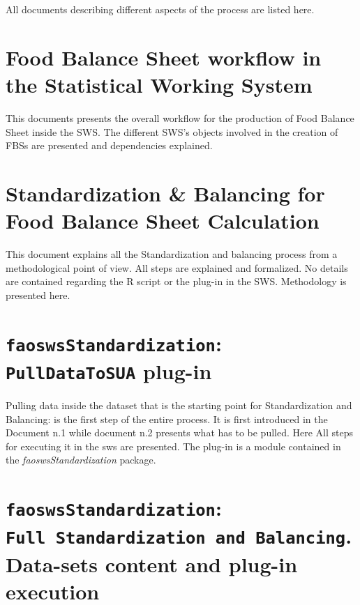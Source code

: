 \documentclass[]{article}
\begin{document}
All documents describing different aspects of the process are listed
here.

\section{Food Balance Sheet workflow in the Statistical Working
System}\label{food-balance-sheet-workflow-in-the-statistical-working-system}

This documents presents the overall workflow for the production of Food
Balance Sheet inside the SWS. The different SWS's objects involved in
the creation of FBSs are presented and dependencies explained.

\section{Standardization \& Balancing for Food Balance Sheet
Calculation}\label{standardization-balancing-for-food-balance-sheet-calculation}

This document explains all the Standardization and balancing process
from a methodological point of view. All steps are explained and
formalized. No details are contained regarding the R script or the
plug-in in the SWS. Methodology is presented here.

\section{\texorpdfstring{\texttt{faoswsStandardization}:
\texttt{PullDataToSUA}
plug-in}{faoswsStandardization: PullDataToSUA plug-in}}\label{faoswsstandardization-pulldatatosua-plug-in}

Pulling data inside the dataset that is the starting point for
Standardization and Balancing: is the first step of the entire process.
It is first introduced in the Document n.1 while document n.2 presents
what has to be pulled. Here All steps for executing it in the sws are
presented. The plug-in is a module contained in the
\emph{faoswsStandardization} package.

\section{\texorpdfstring{\texttt{faoswsStandardization}:
\texttt{Full\ Standardization\ and\ Balancing}. Data-sets content and
plug-in
execution}{faoswsStandardization: Full Standardization and Balancing. Data-sets content and plug-in execution}}\label{faoswsstandardization-full-standardization-and-balancing.-data-sets-content-and-plug-in-execution}
\end{document}
